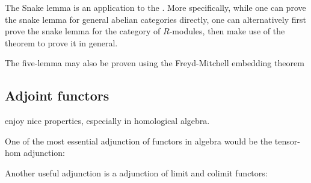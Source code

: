 

The Snake lemma is an application to the . More specifically, while one can prove the snake lemma for general abelian categories directly, one can alternatively first prove the snake lemma for the category of $R$-modules, then make use of the theorem to prove it in general. 








The five-lemma may also be proven using the Freyd-Mitchell embedding theorem




\subsection{Adjoint functors}

 enjoy nice properties, especially in homological algebra. 




One of the most essential adjunction of functors in algebra would be the tensor-hom adjunction:



Another useful adjunction is a adjunction of limit and colimit functors:







